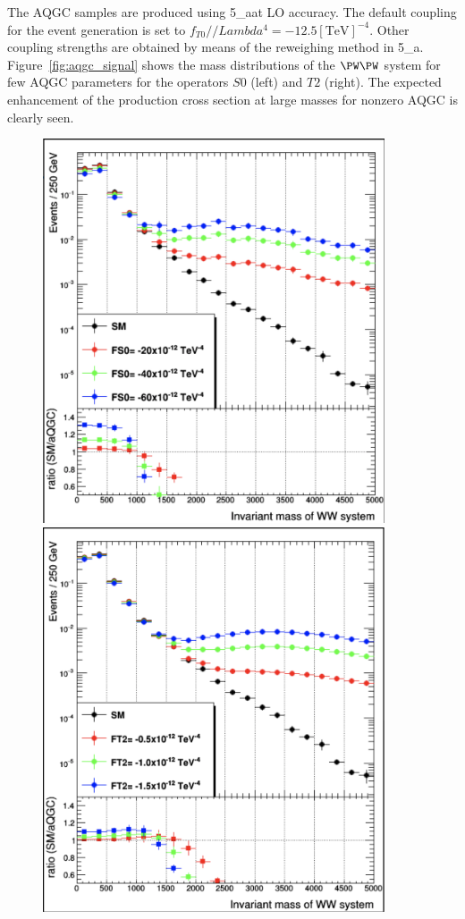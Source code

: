 The AQGC samples are produced using \MADGRAPH{}5\_a\MCATNLO at LO accuracy. The default coupling for the event generation is set to $f_{T0} / /Lambda^{4} = -12.5 [\mathrm{TeV}]^{-4}$. Other coupling strengths are obtained by means of the reweighing method in \MADGRAPH{}5\_a\MCATNLO. Figure~\ref{fig:aqgc_signal} shows the mass distributions of the  $\PW \PW$ system for few AQGC parameters for the operators $S0$ (left) and $T2$ (right). The expected enhancement of the production cross section at large masses for nonzero AQGC is clearly seen.      
  
\begin{figure}[htb]
\centering
\includegraphics[width=0.9\textwidth]{Plots/aQGC_Signal_Scaling/mWW_FS0.png}
\includegraphics[width=0.9\textwidth]{Plots/aQGC_Signal_Scaling/mWW_FT2.png}

\end{figure}
